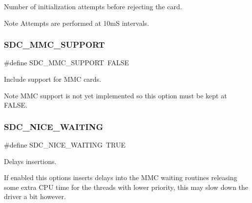 Number of initialization attempts before rejecting the card. 

\begin{DoxyNote}{Note}
Attempts are performed at 10mS intervals. 
\end{DoxyNote}
\hypertarget{group__HAL__CONF_ga4f938eff7370feb8de8411e255d21b01}{}\label{group__HAL__CONF_ga4f938eff7370feb8de8411e255d21b01} 
\subsubsection{\texorpdfstring{S\+D\+C\+\_\+\+M\+M\+C\+\_\+\+S\+U\+P\+P\+O\+RT}{SDC\_MMC\_SUPPORT}}
{\footnotesize\ttfamily \#define S\+D\+C\+\_\+\+M\+M\+C\+\_\+\+S\+U\+P\+P\+O\+RT~F\+A\+L\+SE}



Include support for M\+MC cards. 

\begin{DoxyNote}{Note}
M\+MC support is not yet implemented so this option must be kept at {\ttfamily F\+A\+L\+SE}. 
\end{DoxyNote}
\hypertarget{group__HAL__CONF_ga3391c832c171a8606b0fc864766f08ba}{}\label{group__HAL__CONF_ga3391c832c171a8606b0fc864766f08ba} 
\subsubsection{\texorpdfstring{S\+D\+C\+\_\+\+N\+I\+C\+E\+\_\+\+W\+A\+I\+T\+I\+NG}{SDC\_NICE\_WAITING}}
{\footnotesize\ttfamily \#define S\+D\+C\+\_\+\+N\+I\+C\+E\+\_\+\+W\+A\+I\+T\+I\+NG~T\+R\+UE}



Delays insertions. 

If enabled this options inserts delays into the M\+MC waiting routines releasing some extra C\+PU time for the threads with lower priority, this may slow down the driver a bit however. \hypertarget{group__HAL__CONF_ga81a9fb00c7a1ce0fe70f263d8fd820e8}{}\label{group__HAL__CONF_ga81a9fb00c7a1ce0fe70f263d8fd820e8} 
